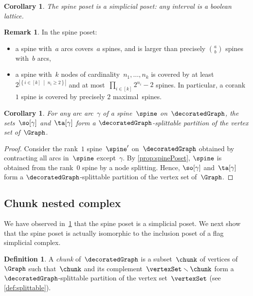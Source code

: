 \documentclass{amsart}
\newtheorem{corollary}[theorem]{Corollary}
\theoremstyle{definition}
\newtheorem{definition}[theorem]{Definition}
\newtheorem{remark}[theorem]{Remark}
\newcommand{\set}[2]{\left\{ #1 \;\middle|\; #2 \right\}} %
\newcommand{\ssm}{\smallsetminus} %
\newcommand{\darkblue}{\color{darkblue}} %
\newcommand{\defn}[1]{\textsl{\darkblue #1}} %
\newcommand{\vincent}[1]{\todo[color=blue!30]{#1 \\ \hfill --- V.}}
\begin{document}
\begin{corollary}
  \label{coro:simplicialPoset}
  The spine poset is a simplicial poset: any interval is a boolean lattice.
  \vincent{todo}
\end{corollary}

\begin{remark}
  In the spine poset:
  \begin{itemize}
    \item a spine with~$a$ arcs covers~$a$ spines, and is larger than precisely $\binom{a}{b}$ spines with~$b$ arcs,
    \item a spine with~$k$ nodes of cardinality~$n_1, \dots, n_k$ is covered by at least~$2^{|\set{i \in [k]}{n_i \ge 2}|}$ and at most~$\prod_{i \in [k]} 2^{n_i}-2$ spines. In particular, a corank~$1$ spine is covered by precisely $2$ maximal~spines.
  \end{itemize}
\end{remark}

\begin{corollary}
  \label{coro:splittablePartitions}
  For any arc arc~$\gamma$ of a spine~$\spine$ on~$\decoratedGraph$, the sets~$\so[\gamma]$ and~$\ta[\gamma]$ form a $\decoratedGraph$-splittable partition of the vertex set of~$\Graph$.
\end{corollary}

\begin{proof}
  Consider the rank~$1$ spine~$\spine'$ on~$\decoratedGraph$ obtained by contracting all arcs in~$\spine$ except~$\gamma$. 
  By \cref{prop:spinePoset}, $\spine$ is obtained from the rank~$0$ spine by a node splitting. 
  Hence, $\so[\gamma]$ and~$\ta[\gamma]$ form a $\decoratedGraph$-splittable partition of the vertex set of~$\Graph$.
\end{proof}


\subsection{Chunk nested complex}
\label{subsec:nestedComplex}

We have observed in~\cref{coro:simplicialPoset} that the spine poset is a simplicial poset.
We next show that the spine poset is actually isomorphic to the inclusion poset of a flag simplicial complex.

\begin{definition}
  \label{def:chunk}
  A \defn{chunk} of~$\decoratedGraph$ is a subset~$\chunk$ of vertices of~$\Graph$ such that~$\chunk$ and its complement~$\vertexSet \ssm \chunk$ form a $\decoratedGraph$-splittable partition of the vertex set~$\vertexSet$ (see \cref{def:splittable}).
\end{definition}
\end{document}
